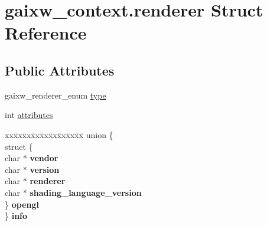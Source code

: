 \hypertarget{structgaixw__context_8renderer}{}\section{gaixw\+\_\+context.\+renderer Struct Reference}
\label{structgaixw__context_8renderer}
\subsection*{Public Attributes}
\begin{DoxyCompactItemize}
\item 
gaixw\+\_\+renderer\+\_\+enum \hyperlink{structgaixw__context_8renderer_a599dcce2998a6b40b1e38e8c6006cb0a}{type}
\item 
int \hyperlink{structgaixw__context_8renderer_a736b91750e516139acc13c5eb6564f92}{attributes}
\item 
\mbox{\label{structgaixw__context_8renderer_acaf9b6b99962bf5c2264824231d7a40c}} 
\begin{tabbing}
xx\=xx\=xx\=xx\=xx\=xx\=xx\=xx\=xx\=\kill
union \{\\
\mbox{\label{uniongaixw__context_1_1_0D6_1_1_0D9_ade01fe5cc89617f53c4793612f8200d1}} 
\>struct \{\\
\mbox{\label{structgaixw__context_1_1_0D6_1_1_0D9_1_1_0D10_a2fb5d2cdf49b39045da8c0eee73ee8ee}} 
char $\ast$ {\bfseries vendor}\\
\mbox{\label{structgaixw__context_1_1_0D6_1_1_0D9_1_1_0D10_a9fac0600a3a7a531e67dcd508112c56e}} 
char $\ast$ {\bfseries version}\\
\mbox{\label{structgaixw__context_1_1_0D6_1_1_0D9_1_1_0D10_a246df9525d37ffd502dc311fb2bf490e}} 
char $\ast$ {\bfseries renderer}\\
\mbox{\label{structgaixw__context_1_1_0D6_1_1_0D9_1_1_0D10_aa9bea20e89c3c8c4278593252c4f7189}} 
char $\ast$ {\bfseries shading\_language\_version}\\
\>\} {\bfseries opengl}\\
\} {\bfseries info}\\

\end{tabbing}\end{DoxyCompactItemize}


